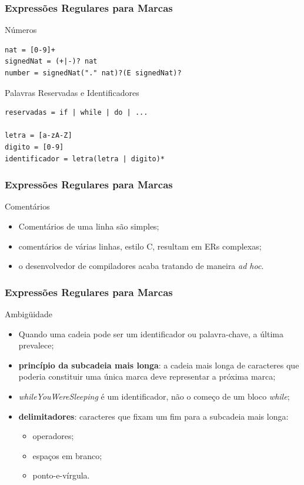\documentclass[table]{beamer}
\begin{document}
\begin{frame}[fragile]
   \frametitle{Expressões Regulares para Marcas}
   \begin{block}{Números}
      \begin{verbatim}
nat = [0-9]+
signedNat = (+|-)? nat
number = signedNat("." nat)?(E signedNat)?
      \end{verbatim}
   \end{block}
   \begin{block}{Palavras Reservadas e Identificadores}
      \begin{verbatim}
reservadas = if | while | do | ...

letra = [a-zA-Z]
digito = [0-9]
identificador = letra(letra | digito)*
      \end{verbatim}
   \end{block}
\end{frame}

\begin{frame}[fragile]
   \frametitle{Expressões Regulares para Marcas}
   \begin{block}{Comentários}
      \begin{itemize}
         \item Comentários de uma linha são simples;
	 \item comentários de várias linhas, estilo C, resultam em ERs complexas;
	 \item o desenvolvedor de compiladores acaba tratando de maneira \textit{ad hoc}.
      \end{itemize}
   \end{block}
\end{frame}

\begin{frame}[fragile]
   \frametitle{Expressões Regulares para Marcas}
   \begin{block}{Ambigüidade}
      \begin{itemize}
         \item Quando uma cadeia pode ser um identificador ou palavra-chave, a última prevalece;
	 \item \textbf{princípio da subcadeia mais longa}: a cadeia mais longa de caracteres que poderia constituir uma única marca deve representar a próxima marca;
	 \item \textit{whileYouWereSleeping} é um identificador, não o começo de um bloco \textit{while};
	 \item \textbf{delimitadores}: caracteres que fixam um fim para a subcadeia mais longa:
	 \begin{itemize}
	    \item operadores;
	    \item espaços em branco;
	    \item ponto-e-vírgula.
	 \end{itemize}
      \end{itemize}
   \end{block}
\end{frame}
\end{document}
